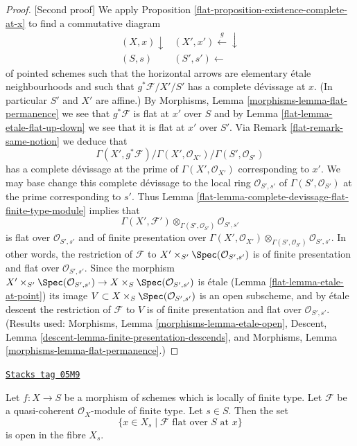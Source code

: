 \begin{proof}
[Second proof]
We apply
Proposition \ref{flat-proposition-existence-complete-at-x}
to find a commutative diagram
$$
\begin{array}{cc}(X, x) \downarrow & (X', x') \overset{g}{\longleftarrow}\downarrow \\ (S, s) & (S', s') \longleftarrow\end{array}
$$
of pointed schemes such that the horizontal
arrows are elementary \'etale neighbourhoods
and such that $g^*\mathcal{F}/X'/S'$ has a complete
d\'evissage at $x$.
(In particular $S'$ and $X'$ are affine.) By
Morphisms, Lemma \ref{morphisms-lemma-flat-permanence}
we see that $g^*\mathcal{F}$ is flat at $x'$ over $S$ and by
Lemma \ref{flat-lemma-etale-flat-up-down}
we see that it is flat at $x'$ over $S'$. Via
Remark \ref{flat-remark-same-notion}
we deduce that
$$
\Gamma(X', g^*\mathcal{F})/
\Gamma(X', \mathcal{O}_{X'})/
\Gamma(S', \mathcal{O}_{S'})
$$
has a complete d\'evissage at the prime of $\Gamma(X', \mathcal{O}_{X'})$
corresponding to $x'$. We may base change this complete
d\'evissage to the local ring $\mathcal{O}_{S', s'}$
of $\Gamma(S', \mathcal{O}_{S'})$ at the prime corresponding to
$s'$. Thus
Lemma \ref{flat-lemma-complete-devissage-flat-finite-type-module}
implies that
$$
\Gamma(X', \mathcal{F}')
\otimes_{\Gamma(S', \mathcal{O}_{S'})}
\mathcal{O}_{S', s'}
$$
is flat over $\mathcal{O}_{S', s'}$ and of finite presentation over
$\Gamma(X', \mathcal{O}_{X'})
\otimes_{\Gamma(S', \mathcal{O}_{S'})} \mathcal{O}_{S', s'}$.
In other words, the restriction of $\mathcal{F}$ to
$X' \times_{S'} \Spec(\mathcal{O}_{S', s'})$
is of finite presentation and flat over $\mathcal{O}_{S', s'}$.
Since the morphism
$X' \times_{S'} \Spec(\mathcal{O}_{S', s'})
\to X \times_S \Spec(\mathcal{O}_{S', s'})$
is \'etale
(Lemma \ref{flat-lemma-etale-at-point})
its image $V \subset X \times_S \Spec(\mathcal{O}_{S', s'})$
is an open subscheme, and by \'etale descent the restriction
of $\mathcal{F}$ to $V$ is of finite presentation and flat over
$\mathcal{O}_{S', s'}$. (Results used:
Morphisms, Lemma \ref{morphisms-lemma-etale-open},
Descent, Lemma \ref{descent-lemma-finite-presentation-descends}, and
Morphisms, Lemma \ref{morphisms-lemma-flat-permanence}.)
\end{proof}

\begin{lemma}
\label{flat-lemma-open-in-fibre-where-flat}
\href{https://stacks.math.columbia.edu/tag/05M9}{\texttt{Stacks tag 05M9}}

Let $f : X \to S$ be a morphism of schemes which is locally of finite type.
Let $\mathcal{F}$ be a quasi-coherent $\mathcal{O}_X$-module of finite type.
Let $s \in S$. Then the set
$$
\{x \in X_s \mid \mathcal{F} \text{ flat over }S\text{ at }x\}
$$
is open in the fibre $X_s$.
\end{lemma}

